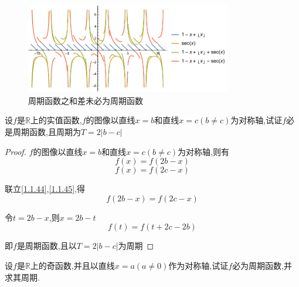 \begin{figure}[htbp]
    \centering
    \includegraphics[width=0.8\textwidth]{../image/1-x+[x]}
    \caption{周期函数之和差未必为周期函数}
\end{figure}

\begin{exercise}[$\ $(双镜效应)]
    设$f$是$\mathbb{R}$上的实值函数,$f$的图像以直线$x=b$和直线$x=c(b\ne c)$为对称轴,试证$f$必是周期函数,且周期为$T=2|b-c|$
\end{exercise}

\begin{proof}
    
    $f$的图像以直线$x=b$和直线$x=c(b\ne c)$为对称轴,则有
    \begin{equation}
        f(x)=f(2b-x) \label{1.1.44}
    \end{equation}
    \begin{equation}
        f(x)=f(2c-x)    \label{1.1.45}
    \end{equation}
    
    联立\cref{1.1.44},\cref{1.1.45},得
    \begin{equation*}
        f(2b-x)=f(2c-x)
    \end{equation*}

    令$t=2b-x$,则$x=2b-t$
    \begin{equation*}
        f(t)=f(t+2c-2b)
    \end{equation*}

    即$f$是周期函数,且以$T=2|b-c|$为周期
\end{proof}

\vspace{5pt}
\begin{exercise}
    设$f$是$\mathbb{R}$上的奇函数,并且以直线$x=a(a\ne 0)$作为对称轴,试证$f$必为周期函数,并求其周期. 
\end{exercise}

